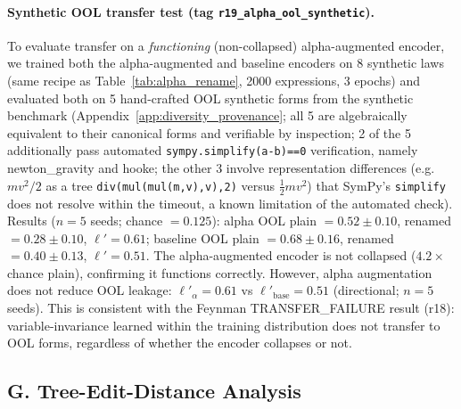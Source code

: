 \paragraph{Synthetic OOL transfer test (tag \texttt{r19\_alpha\_ool\_synthetic}).} To evaluate transfer on a \emph{functioning} (non-collapsed) alpha-augmented encoder, we trained both the alpha-augmented and baseline encoders on 8 synthetic laws (same recipe as Table~\ref{tab:alpha_rename}, 2000 expressions, 3 epochs) and evaluated both on 5 hand-crafted OOL synthetic forms from the synthetic benchmark (Appendix~\ref{app:diversity_provenance}; all 5 are algebraically equivalent to their canonical forms and verifiable by inspection; 2 of the 5 additionally pass automated \texttt{sympy.simplify(a-b)==0} verification, namely newton\_gravity and hooke; the other 3 involve representation differences (e.g.\ $m v^2/2$ as a tree \texttt{div(mul(mul(m,v),v),2)} versus $\frac{1}{2}mv^2$) that SymPy's \texttt{simplify} does not resolve within the timeout, a known limitation of the automated check). Results ($n{=}5$ seeds; chance $= 0.125$): alpha OOL plain $= 0.52 \pm 0.10$, renamed $= 0.28 \pm 0.10$, $\ell' = 0.61$; baseline OOL plain $= 0.68 \pm 0.16$, renamed $= 0.40 \pm 0.13$, $\ell' = 0.51$. The alpha-augmented encoder is not collapsed ($4.2{\times}$ chance plain), confirming it functions correctly. However, alpha augmentation does not reduce OOL leakage: $\ell'_{\alpha} = 0.61$ vs $\ell'_{\text{base}} = 0.51$ (directional; $n{=}5$ seeds). This is consistent with the Feynman TRANSFER\_FAILURE result (r18): variable-invariance learned within the training distribution does not transfer to OOL forms, regardless of whether the encoder collapses or not.

\subsection*{G. Tree-Edit-Distance Analysis}

